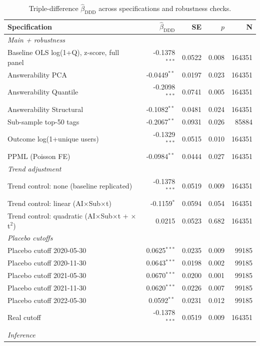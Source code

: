 \begin{table}[h]
\centering
\small
\caption{Triple-difference $\hat\beta_{\text{DDD}}$ across specifications and robustness checks.}
\label{tab:ddd_stress_test}
\begin{tabular}{lrrrr}
\toprule
Specification & $\hat\beta_{\text{DDD}}$ & SE & $p$ & N \\
\midrule
\multicolumn{5}{l}{\textit{Main + robustness}} \\
  Baseline OLS log(1+Q), z-score, full panel & -0.1378$^{***}$ & 0.0522 & 0.008 & 164351 \\
  Answerability PCA & -0.0449$^{**}$ & 0.0197 & 0.023 & 164351 \\
  Answerability Quantile & -0.2098$^{***}$ & 0.0741 & 0.005 & 164351 \\
  Answerability Structural & -0.1082$^{**}$ & 0.0481 & 0.024 & 164351 \\
  Sub-sample top-50 tags & -0.2067$^{**}$ & 0.0931 & 0.026 & 85884 \\
  Outcome log(1+unique users) & -0.1329$^{***}$ & 0.0515 & 0.010 & 164351 \\
  PPML (Poisson FE) & -0.0984$^{**}$ & 0.0444 & 0.027 & 164351 \\
\midrule
\multicolumn{5}{l}{\textit{Trend adjustment}} \\
  Trend control: none (baseline replicated) & -0.1378$^{***}$ & 0.0519 & 0.009 & 164351 \\
  Trend control: linear (AI$\times$Sub$\times$t) & -0.1159$^{*}$ & 0.0594 & 0.054 & 164351 \\
  Trend control: quadratic (AI$\times$Sub$\times$t + $\times$t$^2$) & 0.0215 & 0.0523 & 0.682 & 164351 \\
\midrule
\multicolumn{5}{l}{\textit{Placebo cutoffs}} \\
  Placebo cutoff 2020-05-30 & 0.0625$^{***}$ & 0.0235 & 0.009 & 99185 \\
  Placebo cutoff 2020-11-30 & 0.0643$^{***}$ & 0.0198 & 0.002 & 99185 \\
  Placebo cutoff 2021-05-30 & 0.0670$^{***}$ & 0.0200 & 0.001 & 99185 \\
  Placebo cutoff 2021-11-30 & 0.0620$^{***}$ & 0.0226 & 0.007 & 99185 \\
  Placebo cutoff 2022-05-30 & 0.0592$^{**}$ & 0.0231 & 0.012 & 99185 \\
  Real cutoff & -0.1378$^{***}$ & 0.0519 & 0.009 & 164351 \\
\midrule
\multicolumn{5}{l}{\textit{Inference}} \\

\end{tabular}
\end{table}
